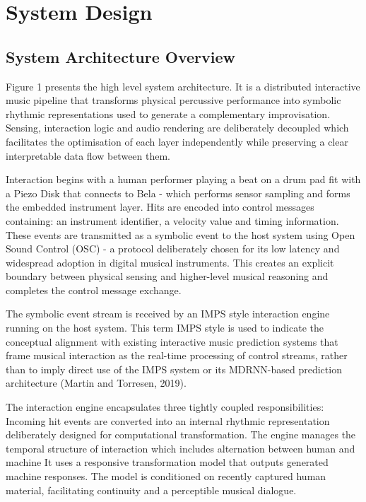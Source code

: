 \documentclass[11pt,a4paper]{article}
\begin{document}
\section{System Design}

\subsection{System Architecture Overview}
Figure 1 presents the high level system architecture. It is a distributed interactive music pipeline that transforms physical percussive performance into symbolic rhythmic representations used to generate a complementary improvisation. Sensing, interaction logic and audio rendering are deliberately decoupled which facilitates the optimisation of each layer independently while preserving a clear interpretable data flow between them. 

Interaction begins with a human performer playing a beat on a drum pad fit with a Piezo Disk that connects to Bela - which performs sensor sampling and forms the embedded instrument layer. Hits are encoded into control messages containing: an instrument identifier, a velocity value and timing information. These events are transmitted as a symbolic event to the host system using Open Sound Control (OSC) - a protocol deliberately chosen for its low latency and widespread adoption in digital musical instruments. This creates an explicit boundary between physical sensing and higher-level musical reasoning and completes the control message exchange.

The symbolic event stream is received by an IMPS style interaction engine running on the host system. This term IMPS style is used to indicate the conceptual alignment with existing interactive music prediction systems that frame musical interaction as the real-time processing of control streams,  rather than to imply direct use of the IMPS system or its MDRNN-based prediction architecture (Martin and Torresen, 2019). 

The interaction engine encapsulates three tightly coupled responsibilities: 
Incoming hit events are converted into an internal rhythmic representation deliberately designed for computational transformation. 
The engine manages the temporal structure of interaction which includes alternation between human and machine 
It uses a responsive transformation model that outputs generated machine responses. 
The model is conditioned on recently captured human material, facilitating continuity and a perceptible musical dialogue. 
\end{document}
